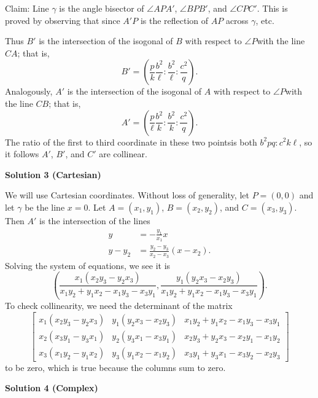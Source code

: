 \begin{enumerate}
 Claim: Line $\gamma$ is the angle bisector of $\angle APA'$, $\angle BPB'$, and $\angle CPC'$. This is proved by observing that since $A'P$ is the reflection of $AP$ across $\gamma$, etc.

 Thus $B'$ is the intersection of the isogonal of $B$ with respect to $\angle P$with the line $CA$; that is,
 \[B' = \left( \frac pk \frac{b^2}{\ell}: \frac{b^2}{\ell} : \frac{c^2}{q} \right).\]Analogously, $A'$ is the intersection of the isogonal of $A$ with respect to $\angle P$with the line $CB$; that is,
 \[A' = \left( \frac{p}{\ell} \frac{b^2}{k} : \frac{b^2}{k} : \frac{c^2}{q} \right).\]The ratio of the first to third coordinate in these two pointsis both $b^2pq : c^2k\ell$, so it follows $A'$, $B'$, and $C'$ are collinear.

 



\textbf{Solution 3 (Cartesian)}

We will use Cartesian coordinates. Without loss of generality, let $P = (0,0)$ and let $\gamma$ be the line $x = 0$. Let $A = (x_1,y_1)$, $B = (x_2,y_2)$, and $C = (x_3,y_3)$. Then $A'$ is the intersection of the lines\begin{align*}y &= -\frac{y_1}{x_1}x \\y - y_2 &= \frac{y_2 - y_3}{x_2 - x_3}(x - x_2).\end{align*}
Solving the system of equations, we see it is
 \[\left(\frac{x_1(x_2y_3 - y_2x_3)}{x_1y_2 + y_1x_2 - x_1y_3 - x_3y_1},\frac{y_1(y_2x_3 - x_2y_3)}{x_1y_2 + y_1x_2 - x_1y_3 - x_3y_1}\right).\]To check collinearity, we need the determinant of the matrix
 \[\begin{bmatrix} x_1(x_2y_3 - y_2x_3) & y_1(y_2x_3 - x_2y_3) & x_1y_2 + y_1x_2 - x_1y_3 - x_3y_1 \\ x_2(x_3y_1 - y_3x_1) & y_2(y_3x_1 - x_3y_1) & x_2y_3 + y_2x_3 - x_2y_1 - x_1y_2 \\ x_3(x_1y_2 - y_1x_2) & y_3(y_1x_2 - x_1y_2) & x_3y_1 + y_3x_1 - x_3y_2 - x_2y_3 \end{bmatrix}\]to be zero, which is true because the columns sum to zero.

 



\textbf{Solution 4 (Complex)}


\end{enumerate}
